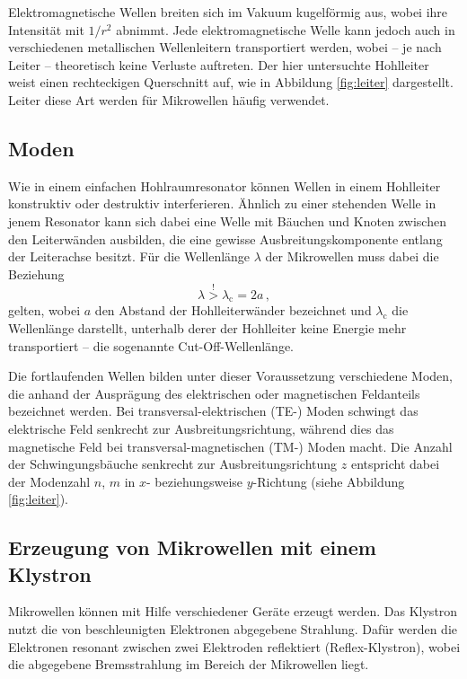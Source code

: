 Elektromagnetische Wellen breiten sich im Vakuum kugelförmig aus, wobei ihre
Intensität mit $1 / r^2$ abnimmt.
Jede elektromagnetische Welle kann jedoch auch in verschiedenen metallischen
Wellenleitern transportiert werden, wobei -- je nach Leiter -- theoretisch
keine Verluste auftreten.
Der hier untersuchte Hohlleiter weist einen rechteckigen Querschnitt auf,
wie in Abbildung \ref{fig:leiter} dargestellt.
Leiter diese Art werden für Mikrowellen häufig verwendet.

\subsection{Moden}
\label{subse:moden}
Wie in einem einfachen Hohlraumresonator können Wellen in einem Hohlleiter
konstruktiv oder destruktiv interferieren.
Ähnlich zu einer stehenden Welle in jenem Resonator kann sich dabei eine Welle
mit Bäuchen und Knoten zwischen den Leiterwänden ausbilden, die eine gewisse
Ausbreitungskomponente entlang der Leiterachse besitzt.
Für die Wellenlänge $\lambda$ der Mikrowellen muss dabei die Beziehung
\begin{equation*}
    \lambda \overset{!}{>} \lambda_\text{c} = 2a\,,
\end{equation*}
gelten, wobei $a$ den Abstand der Hohlleiterwänder bezeichnet und
$\lambda_\text{c}$ die Wellenlänge darstellt, unterhalb derer der Hohlleiter
keine Energie mehr transportiert -- die sogenannte Cut-Off-Wellenlänge.

Die fortlaufenden Wellen bilden unter dieser Voraussetzung verschiedene Moden,
die anhand der Ausprägung des elektrischen oder magnetischen Feldanteils
bezeichnet werden.
Bei transversal-elektrischen (TE-) Moden schwingt das elektrische Feld
senkrecht zur Ausbreitungsrichtung, während dies das magnetische Feld
bei transversal-magnetischen (TM-) Moden macht.
Die Anzahl der Schwingungsbäuche senkrecht zur Ausbreitungsrichtung $z$
entspricht dabei der Modenzahl $n$, $m$ in $x$- beziehungsweise $y$-Richtung
(siehe Abbildung \ref{fig:leiter}).

\subsection{Erzeugung von Mikrowellen mit einem Klystron}
\label{subsec:klystron}
Mikrowellen können mit Hilfe verschiedener Geräte erzeugt werden.
Das Klystron nutzt die von beschleunigten Elektronen abgegebene Strahlung.
Dafür werden die Elektronen resonant zwischen zwei Elektroden reflektiert
(Reflex-Klystron), wobei die abgegebene Bremsstrahlung im Bereich der
Mikrowellen liegt.

